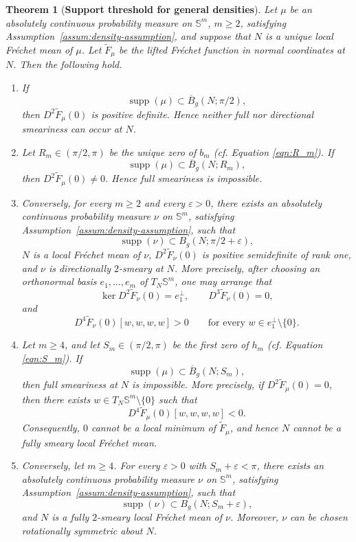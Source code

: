 \documentclass{amsart}
\newtheorem{theorem}{Theorem}[section]
\theoremstyle{definition}
\theoremstyle{remark}
\newcommand\0{\boldsymbol{0}}
\begin{document}
\begin{theorem}[\textbf{Support threshold for general densities}]
\label{thm:general-density-support-threshold}
\label{thm:hemisphre-obstruction-general}
\label{thm:directionally-smeary-rank-one}
\label{prop:rank1_psd_hessian_ball_pihalf_eps}
\label{prop:fourth_derivative_positive_definite}
Let \(\mu\) be an absolutely continuous probability measure on \(\mathbb S^m\), \(m\ge2\), satisfying Assumption~\ref{assum:density-assumption}, and suppose that \(N\) is a unique local Fréchet mean of \(\mu\). Let \(\widetilde F_\mu\) be the lifted Fréchet function in normal coordinates at \(N\). Then the following hold.

\begin{enumerate}
\item[(i)] If
\[
\operatorname{supp}(\mu)\subset \overline B_g(N;\pi/2),
\]
then \(D^2\widetilde F_\mu(0)\) is positive definite. Hence neither full nor directional smeariness can occur at \(N\).

\item[(ii)] Let \(R_m\in(\pi/2,\pi)\) be the unique zero of \(b_m\) (cf. Equation \eqref{eqn:R_m}). If
\[
\operatorname{supp}(\mu)\subset \overline B_g(N;R_m),
\]
then \(D^2\widetilde F_\mu(0)\neq0\). Hence full smeariness is impossible.



\item[(iii)] Conversely, for every \(m\ge2\) and every \(\varepsilon>0\), there exists an absolutely continuous probability measure \(\nu\) on \(\mathbb S^m\), satisfying Assumption~\ref{assum:density-assumption}, such that
\[
\operatorname{supp}(\nu)\subset B_g(N;\pi/2+\varepsilon),
\]
\(N\) is a local Fréchet mean of \(\nu\), \(D^2\widetilde F_\nu(0)\) is positive semidefinite of rank one, and \(\nu\) is directionally \(2\)-smeary at \(N\). More precisely, after choosing an orthonormal basis \(e_1,\ldots,e_m\) of \(T_N\mathbb S^m\), one may arrange that
\[
\ker D^2\widetilde F_\nu(0)=e_1^\perp,
\qquad
D^3\widetilde F_\nu(0)=0,
\]
and
\[
D^4\widetilde F_\nu(0)[w,w,w,w]>0
\qquad\text{for every }w\in e_1^\perp\setminus\{0\}.
\]
\item[(iv)] Let \(m\ge4\), and let \(S_m\in(\pi/2,\pi)\) be the first zero of \(h_m\) (cf. Equation \eqref{eqn:S_m}). If
\[
\operatorname{supp}(\mu)\subset \overline B_g(N;S_m),
\]
then full smeariness at \(N\) is impossible. More precisely, if
\(D^2\widetilde F_\mu(0)=0\), then there exists \(w\in T_N\mathbb S^m\setminus\{0\}\) such that
\[
D^4\widetilde F_\mu(0)[w,w,w,w]<0.
\]
Consequently, \(0\) cannot be a local minimum of \(\widetilde F_\mu\), and hence \(N\) cannot be a fully smeary local Fréchet mean.

\item[(v)] Conversely, let \(m\ge4\). For every \(\varepsilon>0\) with \(S_m+\varepsilon<\pi\), there exists an absolutely continuous probability measure \(\nu\) on \(\mathbb S^m\), satisfying Assumption~\ref{assum:density-assumption}, such that
\[
\operatorname{supp}(\nu)\subset B_g(N;S_m+\varepsilon),
\]
and \(N\) is a fully \(2\)-smeary local Fréchet mean of \(\nu\). Moreover, \(\nu\) can be chosen rotationally symmetric about \(N\).
\end{enumerate}
\end{theorem}
\end{document}
